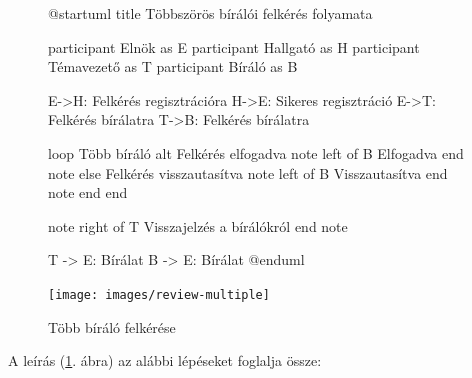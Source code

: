 \documentclass[a4paper,12pt]{article}
\begin{document}
\begin{figure}
\centering
\begin{plantuml}
@startuml
title Többszörös bírálói felkérés folyamata

participant Elnök as E
participant Hallgató as H
participant Témavezető as T
participant Bíráló as B

E->H: Felkérés regisztrációra
H->E: Sikeres regisztráció
E->T: Felkérés bírálatra
T->B: Felkérés bírálatra

loop Több bíráló
	alt Felkérés elfogadva
		note left of B 
		Elfogadva
		end note
	else Felkérés visszautasítva
		note left of B 
		Visszautasítva
		end note
	end
end

note right of T 
Visszajelzés a bírálókról
end note

T -> E: Bírálat
B -> E: Bírálat
@enduml
\end{plantuml}
\texttt{[image: images/review-multiple]}
\caption{Több bíráló felkérése}
\label{fig:review-multiple}
\end{figure}

A leírás (\ref{fig:review-multiple}. ábra) az alábbi lépéseket foglalja össze:
\end{document}

